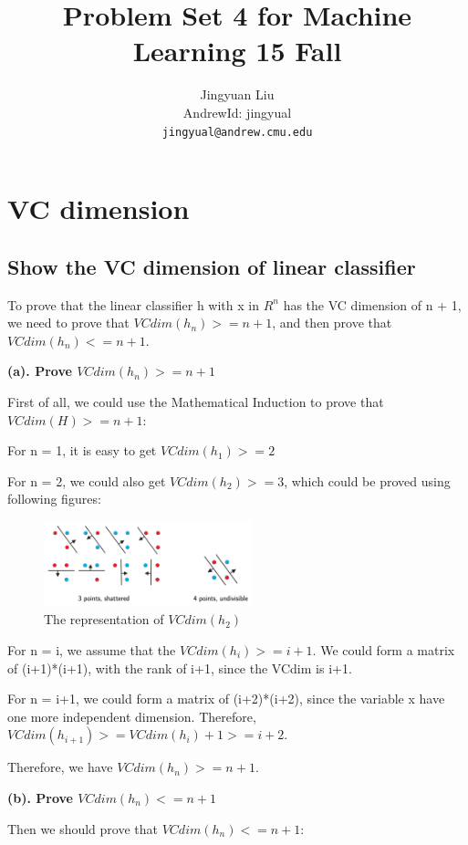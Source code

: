 \documentclass{article} %
\title{Problem Set 4 for Machine Learning 15 Fall}
\author{
Jingyuan Liu\\
AndrewId: jingyual\\
\texttt{jingyual@andrew.cmu.edu} \\
}
\begin{document}
\maketitle



\section{VC dimension}


\subsection{Show the VC dimension of linear classifier}
To prove that the linear classifier h with x in $ R^n $ has the VC dimension of
n + 1, we need to prove that $VCdim(h_n) >= n + 1$, and then prove that
$VCdim(h_n) <= n + 1$.

\textbf{(a). Prove $VCdim(h_n) >= n+1$}

First of all, we could use the Mathematical Induction to prove that $VCdim(H) >=
n+1$:

For n = 1, it is easy to get $VCdim(h_1) >= 2$

For n = 2, we could also get $VCdim(h_2) >= 3$, which could be proved using following figures:

\begin{figure}[!htbp]
\begin{center}
\includegraphics[width=60mm]{pic/q11.png}
\end{center}
\caption{The representation of $VCdim(h_2)$}
\end{figure}

For n = i, we assume that the $VCdim(h_i) >= i+1$. We could form a matrix of
(i+1)*(i+1),
with the rank of i+1, since the VCdim is i+1.

For n = i+1, we could form a matrix of (i+2)*(i+2), since the variable
x have one more independent dimension. Therefore, $VCdim(h_{i+1}) >= VCdim(h_i) + 1
>= i+2$.

Therefore, we have $VCdim(h_n) >= n+1$.

\textbf{(b). Prove $VCdim(h_n) <= n+1$}

Then we should prove that $VCdim(h_n) <= n+1$:
\end{document}
